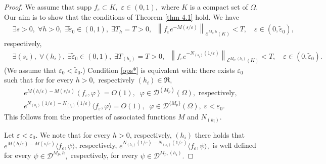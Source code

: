 \documentclass[10pt,a4paper]{amsart}
\begin{document}
\begin{proof}
We assume that $\mbox{supp }f_\varepsilon\subset K,$ $ \varepsilon\in (0,1),$ 
where $K$ is a compact set of $\Omega.$ Our aim is to show that the conditions of Theorem \ref{thm 4.1} hold. We have 
\begin{align*}%
&\exists s>0,\; \forall h>0,\; \exists \tilde\varepsilon_0\in(0,1),\; \exists T_h=T>0,\;\; \left\| f_\varepsilon e^{-M(s/\varepsilon)}\right\|_{\mathcal{E}^{M_p,h}(K)} <T,\quad \varepsilon\in (0,\tilde\varepsilon_0),
\end{align*}
respectively,
\begin{align*}%
&\exists (s_i),\; \forall (h_i),\; \exists \tilde\varepsilon_0\in(0,1),\; \exists T_{(h_i)}=T>0,\;\; \left\| f_\varepsilon e^{-N_{(s_i)}(1/\varepsilon)}\right\|_{\mathcal{E}^{M_p,(h_i)}(K)} <T,\quad \varepsilon\in (0,\tilde\varepsilon_0).
\end{align*}
(We assume that $\varepsilon_0<\tilde\varepsilon_0$.) Condition \eqref{ops*} is equivalent with: there exists $\varepsilon_0$ such that for for every $h>0,$ respectively $(h_i)\in \mathfrak{R},$ 
\begin{align*} \label{nov11}
e^{M(h/\varepsilon)-M(s/\varepsilon)}\left\langle f_\varepsilon,\varphi\right\rangle=O(1),\;\; \varphi\in\mathcal D^{(M_p)}(\Omega),\text{ respectively, }\\
e^{N_{(h_i)}(1/\varepsilon)-N_{(s_i)}(1/\varepsilon)}\langle f_\varepsilon,\varphi\rangle=O(1),\;\; \varphi\in\mathcal D^{\{M_p\}}(\Omega),\;\varepsilon<\varepsilon_0.
\end{align*}
 This follows from the  properties of associated functions $M$ and $N_{(k_i)}.$

Let $\varepsilon<\varepsilon_0$. We note that for every $h>0$, respectively, $(h_i)$ there holds that
$e^{M(h/\varepsilon)-M(s/\varepsilon)}\langle f_\varepsilon, \psi \rangle$, respectively, $e^{N_{(h_i)}(1/\varepsilon)-N_{(s_i)}(1/\varepsilon)}\langle f_\varepsilon, \psi \rangle,$
is well defined for every $\psi\in \mathcal{D}^{M_p,h},$
respectively, for every $\psi\in \mathcal{D}^{M_p,(h_i)}.$


\end{proof}
\end{document}
